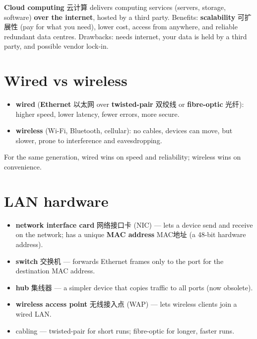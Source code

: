 \documentclass[11pt]{article}
\begin{document}
\textbf{Cloud computing} 云计算 delivers computing services (servers, storage, software) \textbf{over the internet}, hosted by a third party. Benefits: \textbf{scalability} 可扩展性 (pay for what you need), lower cost, access from anywhere, and reliable redundant data centres. Drawbacks: needs internet, your data is held by a third party, and possible vendor lock-in.

\section*{Wired vs wireless}

\begin{itemize}
\item \textbf{wired} (\textbf{Ethernet} 以太网 over \textbf{twisted-pair} 双绞线 or \textbf{fibre-optic} 光纤): higher speed, lower latency, fewer errors, more secure.

\item \textbf{wireless} (Wi-Fi, Bluetooth, cellular): no cables, devices can move, but slower, prone to interference and eavesdropping.

\end{itemize}

For the same generation, wired wins on speed and reliability; wireless wins on convenience.

\section*{LAN hardware}

\begin{itemize}
\item \textbf{network interface card} 网络接口卡 (NIC) — lets a device send and receive on the network; has a unique \textbf{MAC address} MAC地址 (a 48-bit hardware address).

\item \textbf{switch} 交换机 — forwards Ethernet frames only to the port for the destination MAC address.

\item \textbf{hub} 集线器 — a simpler device that copies traffic to all ports (now obsolete).

\item \textbf{wireless access point} 无线接入点 (WAP) — lets wireless clients join a wired LAN.

\item cabling — twisted-pair for short runs; fibre-optic for longer, faster runs.

\end{itemize}
\end{document}
